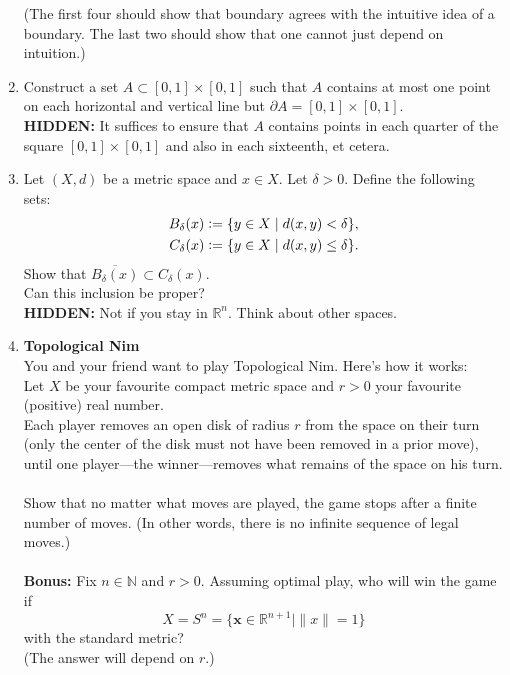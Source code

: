 \documentclass[12pt]{article}
\theoremstyle{definition}
\numberwithin{thm}{section}
\newcommand{\hint}[1]{\textbf{HIDDEN:} {\color[rgb]{0.95, 0.95, 0.95}#1}}
\begin{document}
\begin{enumerate}
	(The first four should show that boundary agrees with the intuitive idea of a boundary. The last two should show that one cannot just depend on intuition.)
	\item Construct a set $A \subset [0, 1] \times [0, 1]$ such that $A$ contains at most one point on each horizontal and vertical line but $\partial A = [0, 1] \times [0, 1].$\\
	\hint{It suffices to ensure that $A$ contains points in each quarter of the square $[0, 1] \times [0, 1]$ and also in each sixteenth, et cetera.}
	\item Let $(X, d)$ be a metric space and $x \in X.$ Let $\delta > 0.$ Define the following sets:
	\begin{align*} 
	 	B_\delta(x) &\vcentcolon= \{y \in X \mid d(x, y) < \delta\},\\
	 	C_\delta(x) &\vcentcolon= \{y \in X \mid d(x, y) \le \delta\}.
	\end{align*} 
	Show that $\overline{B_\delta(x)} \subset C_\delta(x).$\\
	Can this inclusion be proper?\\
	\hint{Not if you stay in $\mathbb{R}^n.$ Think about other spaces.}
	\item \textbf{Topological Nim}\\
	You and your friend want to play Topological Nim. Here's how it works:\\
	Let $X$ be your favourite compact metric space and $r > 0$ your favourite (positive) real number.\\
	Each player removes an open disk of radius $r$ from the space on their turn (only the center of the disk must not have been removed in a prior move), until one player—the winner—removes what remains of the space on his turn.\\~\\
	Show that no matter what moves are played, the game stops after a finite number of moves. (In other words, there is no infinite sequence of legal moves.)\\~\\
	\textbf{Bonus:} Fix $n \in \mathbb{N}$ and $r > 0.$ Assuming optimal play, who will win the game if
	\begin{equation*} 
		X = S^n = \{\mathbf{x} \in \mathbb{R}^{n+1} \mid \|x\| = 1\}
	\end{equation*}
	with the standard metric?\\
	(The answer will depend on $r$.)\\~\\

\end{enumerate}
\end{document}
